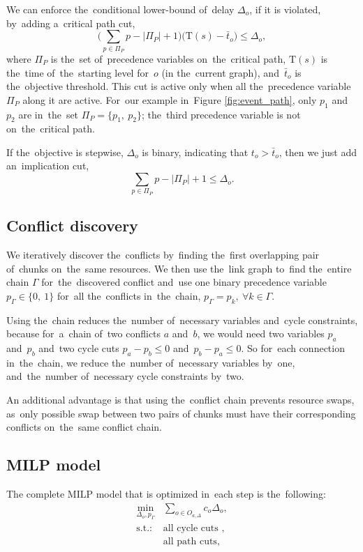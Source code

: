 We can enforce the~conditional lower-bound of~delay $\Delta_o$, if it is violated, by~adding a~critical path cut,
\begin{equation}
\label{eq:path_cut}
  \Big(\sum_{p \in \Pi_{P}} p - |\Pi_P| + 1\Big)\Big(\mathrm{T}(s) - \bar{t}_o\Big) \leq \Delta_o,
\end{equation}
where $\Pi_P$ is the~set of~precedence variables on~the~critical path, $\mathrm{T}(s)$ is the~time of~the~starting level for~$o$ (in the~current graph), and~$\bar{t}_o$ is the~objective threshold. This cut is active only when all the~precedence variable $\Pi_{P}$ along it are active. For~our example in~Figure \ref{fig:event_path}, only $p_1$ and~$p_2$ are in~the~set $\Pi_P = \{p_1,\ p_2\}$; the~third precedence variable is not on~the~critical path.

If the~objective is stepwise, $\Delta_o$ is binary, indicating that $t_o > \bar{t}_o$, then we just add an~implication cut,
\begin{equation}
\label{eq:impl_cut}
  \sum_{p \in \Pi_{P}} p - |\Pi_P| + 1 \leq \Delta_o.
\end{equation}

\subsection{Conflict discovery}
We iteratively discover the~conflicts by~finding the~first overlapping pair of~chunks on~the~same resources. We then use the~link graph to~find the~entire chain $\Gamma$ for~the~discovered conflict and~use one binary precedence variable $p_\Gamma \in \{0,\ 1\}$ for~all the~conflicts in~the~chain, $p_\Gamma = p_k,\ \forall k \in \Gamma$.

Using the~chain reduces the~number of~necessary variables and~cycle constraints, because for~a~chain of~two conflicts $a$ and~$b$, we would need two variables $p_a$ and~$p_b$ and~two cycle cuts $p_a - p_b \leq 0$ and~$p_b - p_a \leq 0$. So for~each connection in~the~chain, we reduce the~number of~necessary variables by~one, and~the~number of~necessary cycle constraints by~two.

An additional advantage is that using the~conflict chain prevents resource swaps, as~only possible swap between two pairs of chunks must have their corresponding conflicts on~the~same conflict chain.

\subsection{MILP model}
The complete MILP model that is optimized in~each step is the~following:
\begin{align}
  \min_{\Delta_o,p_\Gamma} &\sum_{o \in O_{a,\Delta}} c_o\Delta_o, \\
  \text{s.t.: } &\text{all cycle cuts }, \\
  &\text{all path cuts},
\end{align}

